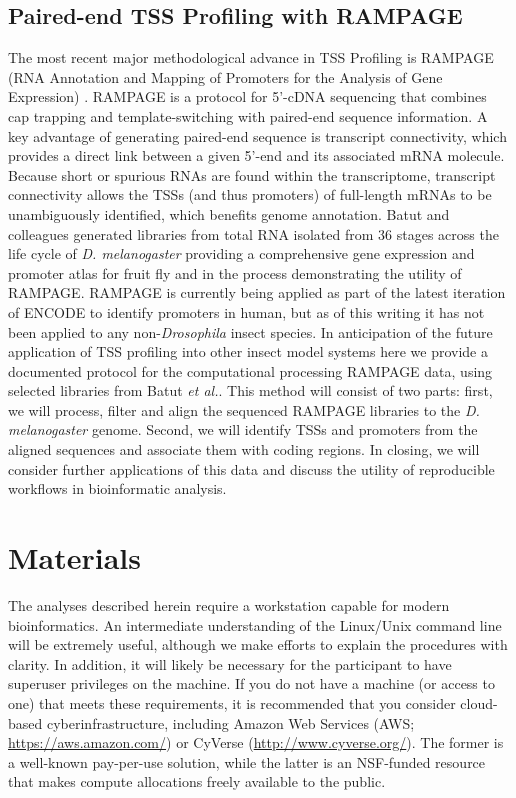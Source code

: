 \documentclass[runningheads,a4paper]{llncs}
\begin{document}
\begin{linenumbers}
\subsection{Paired-end TSS Profiling with RAMPAGE}
The most recent major methodological advance in TSS Profiling is RAMPAGE (RNA Annotation and Mapping of Promoters for the Analysis of Gene Expression)  . 
RAMPAGE is a protocol for 5'-cDNA sequencing that combines cap trapping and template-switching with paired-end sequence information. 
A key advantage of generating paired-end sequence is transcript connectivity, which provides a direct link between a given 5'-end and its associated mRNA molecule.
Because short or spurious RNAs are found within the transcriptome, transcript connectivity allows the TSSs (and thus promoters) of full-length mRNAs to be unambiguously identified, which benefits genome annotation.
Batut and colleagues generated libraries from total RNA isolated from 36 stages across the life cycle of \textit{D. melanogaster} providing a comprehensive gene expression and promoter atlas for fruit fly and in the process demonstrating the utility of RAMPAGE.
RAMPAGE is currently being applied as part of the latest iteration of ENCODE to identify promoters in human, but as of this writing it has not been applied to any non-\textit{Drosophila} insect species. 
In anticipation of the future application of TSS profiling into other insect model systems here we provide a documented protocol for the computational processing RAMPAGE data, using selected libraries from Batut \textit{et al.}. 
This method will consist of two parts: first, we will process, filter and align the sequenced RAMPAGE libraries to the \textit{D. melanogaster} genome. 
Second, we will identify TSSs and promoters from the aligned sequences and associate them with coding regions.
In closing, we will consider further applications of this data and discuss the utility of reproducible workflows in bioinformatic analysis.


\section{Materials}

The analyses described herein require a workstation capable for modern bioinformatics. 
An intermediate understanding of the Linux/Unix command line will be extremely useful, although we make efforts to explain the procedures with clarity. In addition, it will likely be necessary for the participant to have superuser privileges on the machine.
If you do not have a machine (or access to one) that meets these requirements, it is recommended that you consider cloud-based cyberinfrastructure, including Amazon Web Services (AWS; \url{https://aws.amazon.com/}) or CyVerse (\url{http://www.cyverse.org/}).
The former is a well-known pay-per-use solution, while the latter is an NSF-funded resource that makes compute allocations freely available to the public.


\end{linenumbers}
\end{document}
